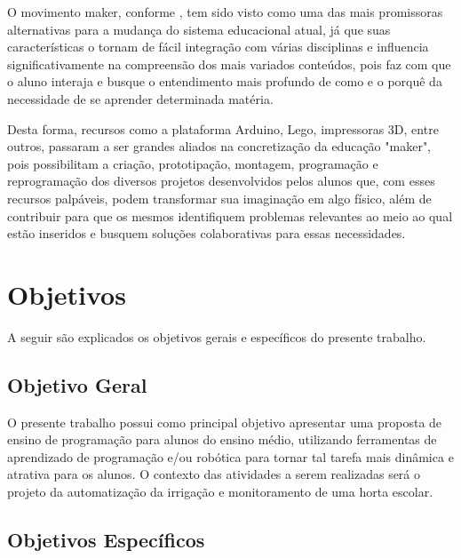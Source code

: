 \documentclass[12pt]{article}
\begin{document}
    O movimento maker, conforme \cite{estadao}, tem sido visto como uma das mais promissoras alternativas para a mudança do sistema educacional atual, já que suas características o tornam de fácil integração com várias disciplinas e influencia significativamente na compreensão dos mais variados conteúdos, pois faz com que o aluno interaja e busque o entendimento mais profundo de como e o porquê da necessidade de se aprender determinada matéria.
    
    Desta forma, recursos como a plataforma Arduino, Lego, impressoras 3D, entre outros, passaram a ser grandes aliados na concretização da educação "maker", pois possibilitam a criação, prototipação, montagem, programação e reprogramação dos diversos projetos desenvolvidos pelos alunos que, com esses recursos palpáveis, podem transformar sua imaginação em algo físico, além de contribuir para que os mesmos identifiquem problemas relevantes ao meio  ao qual estão inseridos e busquem soluções colaborativas para essas necessidades.


	\section{Objetivos}
A seguir são explicados os objetivos gerais e específicos do presente trabalho.
	\subsection{Objetivo Geral}
	O presente trabalho possui como principal objetivo apresentar uma proposta de ensino de programação para alunos do ensino médio, utilizando ferramentas de aprendizado de programação e/ou robótica para tornar tal tarefa mais dinâmica e atrativa para os alunos. O contexto das atividades a serem realizadas será o projeto da automatização da irrigação e monitoramento de uma horta escolar.   
    
	\subsection{Objetivos Específicos}
	
\end{document}
